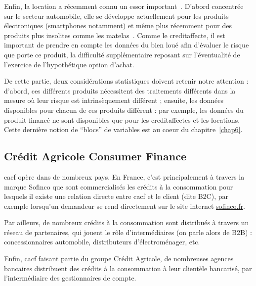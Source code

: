 Enfin, la \gls{location} a récemment connu un essor important~\cite{peden_2018}. D'abord concentrée sur le secteur automobile, elle se développe actuellement pour les produits électroniques (smartphones notamment) et même plus récemment pour des produits plus insolites comme les matelas~\cite{dicharry_2017}. Comme le \gls{creditaffecte}, il est important de prendre en compte les données du bien loué afin d'évaluer le risque que porte ce produit, la difficulté supplémentaire reposant sur l'éventualité de l'exercice de l'hypothétique option d'achat.

De cette partie, deux considérations statistiques doivent retenir notre attention : d'abord, ces différents produits nécessitent des traitements différents dans la mesure où leur risque est intrinsèquement différent ; ensuite, les données disponibles pour chacun de ces produits diffèrent : par exemple, les données du produit financé ne sont disponibles que pour les \glspl{creditaffecte} et les \glspl{location}. Cette dernière notion de ``blocs'' de variables est au coeur du chapitre~\ref{chap6}.


\subsection{Crédit Agricole Consumer Finance}

\gls{cacf} opère dans de nombreux pays. En France, c'est principalement à travers la marque Sofinco que sont commercialisés les crédits à la consommation pour lesquels il existe une relation directe entre \gls{cacf} et le client (dite B2C), par exemple lorsqu'un demandeur se rend directement sur le site internet \href{https://www.sofinco.fr}{sofinco.fr}.

Par ailleurs, de nombreux crédits à la consommation sont distribués à travers un réseau de partenaires, qui jouent le rôle d'intermédiaires (on parle alors de B2B) : concessionnaires automobile, distributeurs d'électroménager, etc.

Enfin, \gls{cacf} faisant partie du groupe Crédit Agricole, de nombreuses agences bancaires distribuent des crédits à la consommation à leur clientèle bancarisé, par l'intermédiaire des gestionnaires de compte.

